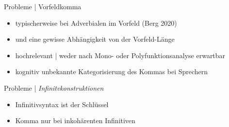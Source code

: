 \begin{frame}
	{Probleme | Vorfeldkomma}
	\begin{exe}
	\end{exe}
	\Zeile
	\onslide<+->
	\begin{itemize}[<+->]
		\item typischerweise bei Adverbialen im Vorfeld (Berg 2020)
		\item und eine gewisse Abhängigkeit von der Vorfeld-Länge
			\Halbzeile
		\item hochrelevant | \alert{weder nach Mono- oder Polyfunktionsanalyse erwartbar}
		\item kognitiv unbekannte Kategorisierung des Kommas bei Sprechern
	\end{itemize}
\end{frame}

\begin{frame}
  {Probleme | \textit{Infinitvkonstruktionen}}
  \begin{exe}
  \end{exe}
  \onslide<+->
  \Zeile
  \begin{itemize}[<+->]
    \item \alert{Infinitivsyntax} ist der Schlüssel
    \item Komma nur bei \alert{inkohärenten Infinitiven}
  \end{itemize}
\end{frame}

